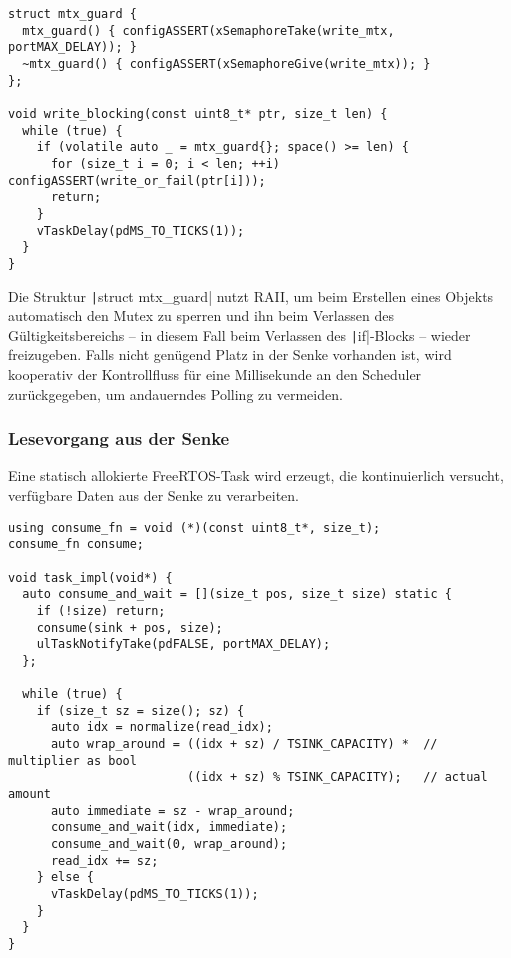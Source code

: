 \begin{code}
\begin{verbatim}
struct mtx_guard {
  mtx_guard() { configASSERT(xSemaphoreTake(write_mtx, portMAX_DELAY)); }
  ~mtx_guard() { configASSERT(xSemaphoreGive(write_mtx)); }
};

void write_blocking(const uint8_t* ptr, size_t len) {
  while (true) {
    if (volatile auto _ = mtx_guard{}; space() >= len) {
      for (size_t i = 0; i < len; ++i) configASSERT(write_or_fail(ptr[i]));
      return;
    }
    vTaskDelay(pdMS_TO_TICKS(1));
  }
}
\end{verbatim}
\end{code}

Die Struktur \texttt|struct mtx_guard| nutzt \ac{RAII}, um beim
Erstellen eines Objekts automatisch den Mutex zu sperren und ihn beim Verlassen
des Gültigkeitsbereichs -- in diesem Fall beim Verlassen des
\texttt|if|-Blocks -- wieder freizugeben. Falls nicht genügend Platz in
der Senke vorhanden ist, wird kooperativ der Kontrollfluss für eine Millisekunde
an den Scheduler zurückgegeben, um andauerndes Polling zu vermeiden.

\subsubsection{Lesevorgang aus der Senke}

Eine statisch allokierte FreeRTOS-Task wird erzeugt, die kontinuierlich
versucht, verfügbare Daten aus der Senke zu verarbeiten.

\begin{code}
\begin{verbatim}
using consume_fn = void (*)(const uint8_t*, size_t);
consume_fn consume;

void task_impl(void*) {
  auto consume_and_wait = [](size_t pos, size_t size) static {
    if (!size) return;
    consume(sink + pos, size);
    ulTaskNotifyTake(pdFALSE, portMAX_DELAY);
  };

  while (true) {
    if (size_t sz = size(); sz) {
      auto idx = normalize(read_idx);
      auto wrap_around = ((idx + sz) / TSINK_CAPACITY) *  // multiplier as bool
                         ((idx + sz) % TSINK_CAPACITY);   // actual amount
      auto immediate = sz - wrap_around;
      consume_and_wait(idx, immediate);
      consume_and_wait(0, wrap_around);
      read_idx += sz;
    } else {
      vTaskDelay(pdMS_TO_TICKS(1));
    }
  }
}
\end{verbatim}
    \label{code:consumer_task}
\end{code}

